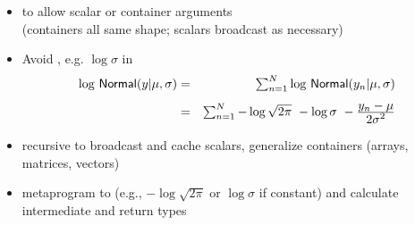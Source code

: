 \documentclass[10pt]{report}
\begin{document}
\begin{itemize}
\item {} to allow scalar or container arguments
  \\ {\footnotesize (containers all same shape; scalars broadcast as necessary)}
\item Avoid , e.g. $\log \sigma$ in
  \hspace*{-18pt}
  {\small
    \begin{eqnarray*}
      \textstyle \log \, \mbox{\sf Normal}(y | \mu, \sigma)
      & = & \textstyle \sum_{n=1}^N \log \, \mbox{\sf Normal}(y_n | \mu,\sigma)
      \\[4pt]
      & = & \textstyle \sum_{n=1}^N  - \log \sqrt{2\pi} \ - \log \sigma \ -
      \frac{\textstyle y_n - \mu}{\textstyle 2\sigma^2}
    \end{eqnarray*}
  }
\item recursive  to broadcast and cache scalars,
  generalize containers (arrays, matrices, vectors)
\item {} metaprogram to  (e.g., $-\log
  \sqrt{2 \pi}$ or $\log \sigma$ if constant) 
  and calculate intermediate and return types
\end{itemize}


\end{document}
